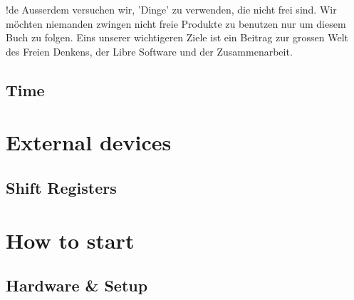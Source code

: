 \documentclass[twoside,12pt,authoryear,openright]{book}
\begin{document}
!de Ausserdem versuchen wir, 'Dinge' zu verwenden, die nicht frei sind. Wir möchten niemanden zwingen nicht freie Produkte zu benutzen nur um diesem Buch zu folgen. Eins unserer wichtigeren Ziele ist ein Beitrag zur grossen Welt des Freien Denkens, der Libre Software und der Zusammenarbeit.










\chapter{Time}




\part{External devices}

\chapter{Shift Registers}




\part{How to start}

\chapter{Hardware & Setup}


\end{document}
